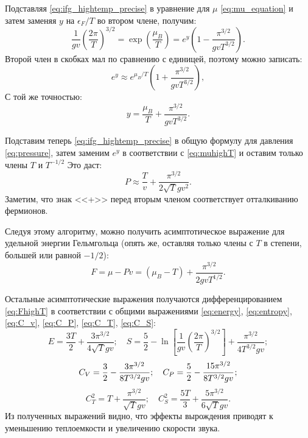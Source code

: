 Подставляя \eqref{eq:ifg_hightemp_precise} в уравнение для $\mu$ \eqref{eq:mu_equation} и затем заменяя $y$ на $\epsilon_F / T$ во втором члене, получим:
\begin{equation}
    \label{eq:mu_equation_high_T}
    \frac{1}{gv}\left( \frac{2\pi}{T} \right)^{3/2}
    = \exp\left(\frac{\mu_B}{T}\right)
    = e^y\left( 1 - \frac{\pi^{3/2}}{gvT^{3/2}} \right).
\end{equation}
Второй член в скобках мал по сравнению с единицей, поэтому можно записать:
\begin{equation}
    \label{eq:muhighT}
    e^y \approx e^{\mu_B / T}\left( 1 + \frac{\pi^{3/2}}{gvT^{3/2}} \right),
\end{equation}
С той же точностью:
\begin{equation*}
  y = \frac{\mu_B}{T} + \frac{\pi^{3/2}}{gvT^{3/2}}.
\end{equation*}

Подставим теперь \eqref{eq:ifg_hightemp_precise} в общую формулу для давления \eqref{eq:pressure}, затем заменим $e^{y}$ в соответствии с \eqref{eq:muhighT} и оставим только члены $T$ и $T^{-1 / 2}$
Это даст:
\begin{equation}
    \label{eq:p_ht}
    P \approx \frac{T}{v} + \frac{\pi^{3/2}}{2\sqrt{T}gv^2}.
\end{equation}
Заметим, что знак <<+>> перед вторым членом соответствует отталкиванию фермионов.

Следуя этому алгоритму, можно получить асимптотическое выражение для удельной энергии Гельмгольца (опять же, оставляя только члены с $T$ в степени, большей или равной $-1 / 2$):
\begin{equation}
    \label{eq:FhighT}
    F = \mu - Pv
    = (\mu_B - T) + \frac{\pi^{3/2}}{2gvT^{1/2}}.
\end{equation}

Остальные асимптотические выражения получаются дифференцированием \eqref{eq:FhighT} в соответствии с общими выражениями \eqref{eq:energy}, \eqref{eq:entropy}, \eqref{eq:C_v}, \eqref{eq:C_P}, \eqref{eq:C_T}, \eqref{eq:C_S}:
\begin{equation}
    \label{eq:EShighT}
    E = \frac{3T}{2} + \frac{3\pi^{3/2}}{4\sqrt{T}gv};\quad S
    = \frac{5}{2} - \ln\left[ \frac{1}{gv}\left( \frac{2\pi}{T} \right)^{3/2} \right] + \frac{\pi^{3/2}}{4T^{3/2}gv};
\end{equation}
\begin{equation}
    \label{eq:CVCPhighT}
    C_V = \frac{3}{2} - \frac{3\pi^{3/2}}{8T^{3/2}gv};\quad
    C_P = \frac{5}{2} - \cfrac{15 \pi^{3 / 2}}{8 T^{3 / 2} g v}\, ;
\end{equation}
\begin{equation}
    \label{eq:CTCShighT}
    C_T^2 = T + \frac{\pi^{3/2}}{\sqrt{T}gv};\quad
    C_S^2 = \frac{5 T}{3} + \frac{5 \pi^{3/2}}{6 \sqrt{T}gv} .
\end{equation}
Из полученных выражений видно, что эффекты вырождения приводят к уменьшению теплоемкости и увеличению скорости звука.

